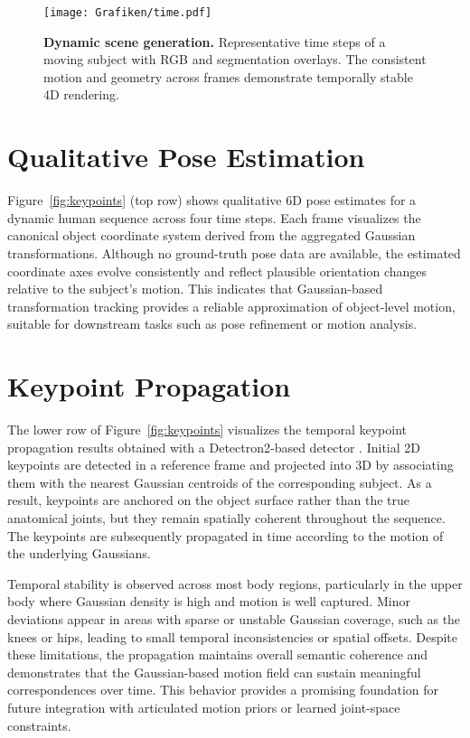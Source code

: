 \begin{figure}[t]
    \centering
    \texttt{[image: Grafiken/time.pdf]}
    \caption{
        \textbf{Dynamic scene generation.}
        Representative time steps of a moving subject with RGB and segmentation overlays.
        The consistent motion and geometry across frames demonstrate temporally stable 4D rendering.
    }
    \label{fig:temporal}
\end{figure}

\section{Qualitative Pose Estimation}
Figure~\ref{fig:keypoints} (top row) shows qualitative 6D pose estimates for a dynamic human sequence across four time steps. 
Each frame visualizes the canonical object coordinate system derived from the aggregated Gaussian transformations. 
Although no ground-truth pose data are available, the estimated coordinate axes evolve consistently and reflect plausible orientation changes relative to the subject’s motion. 
This indicates that Gaussian-based transformation tracking provides a reliable approximation of object-level motion, suitable for downstream tasks such as pose refinement or motion analysis.

\section{Keypoint Propagation}
The lower row of Figure~\ref{fig:keypoints} visualizes the temporal keypoint propagation results obtained with a Detectron2-based detector \cite{Detectron22020}. 
Initial 2D keypoints are detected in a reference frame and projected into 3D by associating them with the nearest Gaussian centroids of the corresponding subject. 
As a result, keypoints are anchored on the object surface rather than the true anatomical joints, but they remain spatially coherent throughout the sequence. 
The keypoints are subsequently propagated in time according to the motion of the underlying Gaussians.

Temporal stability is observed across most body regions, particularly in the upper body where Gaussian density is high and motion is well captured. 
Minor deviations appear in areas with sparse or unstable Gaussian coverage, such as the knees or hips, leading to small temporal inconsistencies or spatial offsets. 
Despite these limitations, the propagation maintains overall semantic coherence and demonstrates that the Gaussian-based motion field can sustain meaningful correspondences over time. 
This behavior provides a promising foundation for future integration with articulated motion priors or learned joint-space constraints.

